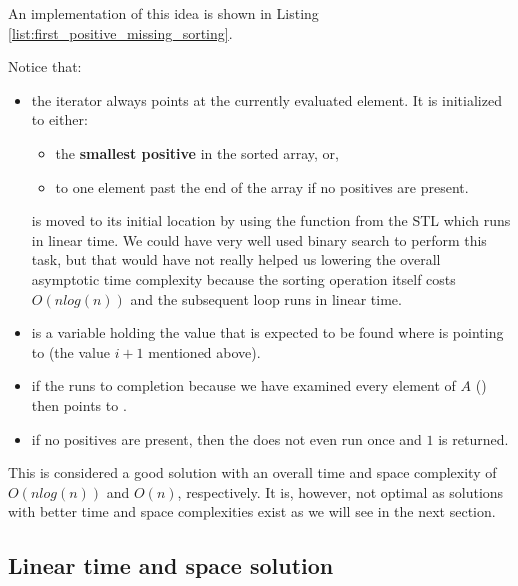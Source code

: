 An implementation of this idea is shown in Listing
\ref{list:first_positive_missing_sorting}.




Notice that:
\begin{itemize}
	\item the iterator  always points at the currently evaluated element. 
	It is initialized to either:
	\begin{itemize}
		\item the \textbf{smallest positive} in the sorted array, or,
		\item to one element past the end of the array if no positives are present.
	\end{itemize}
	 is moved to its initial location by using the  function from the STL which runs in linear time. We could have very well used binary search to perform this task, but that would have not really helped us lowering the overall asymptotic time complexity because the sorting operation itself costs $O(nlog(n))$ and the subsequent  loop runs in linear time. 
	\item {} is a variable holding the value that is expected to be found where  is pointing to (the value $i+1$ mentioned above).
	\item if the  runs to completion because we have examined every element of $A$ () then  points to .
	\item if no positives are present, then the  does not even run once and $1$ is returned.
\end{itemize}

This is considered a good solution with an overall time and space complexity of $O(nlog(n))$ and $O(n)$, respectively. It is, however, not optimal as solutions with better time and space complexities exist as we will see in the next section. 



\subsection{Linear time and space solution}
\label{first_positive_missing:sec:linear_space}

